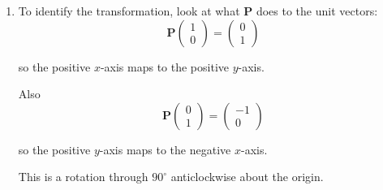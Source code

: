 \documentclass[leqno]{article}
\begin{document}
\begin{enumerate}[
  label=\textbf{\arabic*.},
  leftmargin=*,
  topsep=0pt,
  partopsep=0pt,
  parsep=0pt
]
\begin{djsSolution}
\begin{enumerate}[label=\textbf{(\alph*)}]
  Applying
  \[
  \mathbf{P}=\begin{pmatrix}0&-1\\1&0\end{pmatrix}
  \]

  gives
  \[
  \mathbf{P}\begin{pmatrix}x\\y\end{pmatrix}
  =
  \begin{pmatrix}0&-1\\1&0\end{pmatrix}\begin{pmatrix}x\\y\end{pmatrix}
  =
  \begin{pmatrix}-y\\x\end{pmatrix}
  \]

  So each point \((x,y)\) maps to \((-y,x)\).

  For \(A(-2,1)\):
  \[
  A' = (-1,-2)
  \]

  For \(B(1,1)\):
  \[
  B' = (-1,1)
  \]

  For \(C(1,5)\):
  \[
  C' = (-5,1)
  \]

  Hence the vertices of \(T'\) are \(A'(-1,-2)\), \(B'(-1,1)\), \(C'(-5,1)\).

  \item To identify the transformation, look at what \(\mathbf{P}\) does to the unit vectors:
  \[
  \mathbf{P}\begin{pmatrix}1\\0\end{pmatrix}
  =
  \begin{pmatrix}0\\1\end{pmatrix}
  \]

  so the positive \(x\)-axis maps to the positive \(y\)-axis.

  Also
  \[
  \mathbf{P}\begin{pmatrix}0\\1\end{pmatrix}
  =
  \begin{pmatrix}-1\\0\end{pmatrix}
  \]

  so the positive \(y\)-axis maps to the negative \(x\)-axis.

  This is a rotation through \(90^\circ\) anticlockwise about the origin.


\end{enumerate}
\end{djsSolution}
\end{enumerate}
\end{document}

